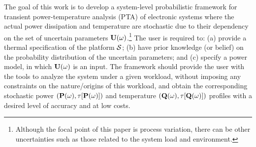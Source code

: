 The goal of this work is to develop a system-level probabilistic framework for transient power-temperature analysis (PTA) of electronic systems where the actual power dissipation and temperature are stochastic due to their dependency on the set of uncertain parameters $\mathbf{U}(\omega)$.\footnote{Although the focal point of this paper is process variation, there can be other uncertainties such as those related to the system load and environment.}
The user is required to: (a) provide a thermal specification of the platform $\mathcal{S}$; (b) have prior knowledge (or belief) on the probability distribution of the uncertain parameters; and (c) specify a power model, in which $\mathbf{U}(\omega)$ is an input.
The framework should provide the user with the tools to analyze the system under a given workload, without imposing any constraints on the nature/origins of this workload, and obtain the corresponding stochastic power $\profileP{\o}$ and temperature $\profileT{\o}$ profiles with a desired level of accuracy and at low costs.
